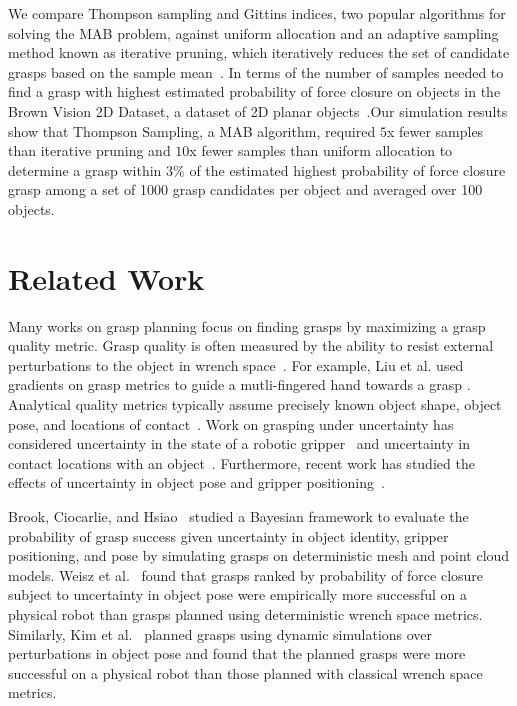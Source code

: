 \documentclass[10pt, conference]{ieeeconf}      %
\begin{document}
We compare Thompson sampling and Gittins indices, two popular algorithms for solving the MAB problem,
against uniform allocation and an adaptive sampling method known as iterative pruning, which iteratively reduces the set
of candidate grasps based on the sample mean~\cite{kehoe2012toward}. 
In terms of the number of samples needed to find a grasp with highest estimated probability of force closure on objects in the Brown Vision 2D Dataset, a dataset of 2D planar objects~\cite{brown, christopoulos2007handling}.Our simulation results show that Thompson Sampling, a MAB algorithm, required $5$x fewer samples than iterative
pruning and $10$x fewer samples than uniform allocation to determine a grasp within $3\%$ of the estimated highest probability of force closure
grasp among a set of 1000 grasp candidates per object and averaged over 100 objects.





\section{Related Work}

Many works on grasp planning focus on finding grasps by maximizing a grasp quality metric. Grasp quality is often measured by the ability to resist external perturbations to the object in wrench space~\cite{ferrari1992, miller2004graspit}. For example, Liu et al. used gradients on grasp metrics to guide a mutli-fingered hand towards a grasp \cite{liu2004quality}. Analytical quality metrics typically assume precisely known object shape, object pose, and locations of contact~\cite{cheong2011output, ciocarlie2009}. Work on grasping under uncertainty has considered uncertainty in the state of a robotic gripper~\cite{goldberg1990bayesian, stulp2011learning} and uncertainty in contact locations with an object~\cite{zheng2005}. Furthermore, recent work has studied the effects of uncertainty in object pose and gripper positioning~\cite{brook2011collaborative, hsiao2011bayesian}.

Brook, Ciocarlie, and Hsiao~\cite{brook2011collaborative, hsiao2011bayesian} studied a Bayesian framework to evaluate the probability of grasp success given uncertainty in object identity, gripper positioning, and pose by simulating grasps on deterministic mesh and point cloud models.
Weisz et al.~\cite{weisz2012pose} found that grasps ranked by probability of force closure subject to uncertainty in object pose were empirically more successful on a physical robot than grasps planned using deterministic wrench space metrics. 
Similarly, Kim et al.~\cite{kim2012physically} planned grasps using dynamic simulations over perturbations in object pose and found that the planned grasps were more successful on a physical robot than those planned with classical wrench space metrics.
\end{document}
